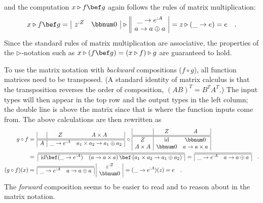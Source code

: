 and the computation $x\triangleright f\bef g$ again follows the rules
of matrix multiplication:
\[
x\triangleright f\bef g=\,\begin{array}{|cc|}
z^{:Z} & \bbnum 0\end{array}\,\triangleright\,\begin{array}{||c|}
\_\rightarrow e^{:A}\\
a\rightarrow a\oplus a
\end{array}\,=z\triangleright(\_\rightarrow e)=e\quad.
\]
Since the standard rules of matrix multiplication are associative,
the properties of the $\triangleright$-notation such as $x\triangleright(f\bef g)=(x\triangleright f)\triangleright g$
are guaranteed to hold.

To use the matrix notation with \emph{backward} compositions ($f\circ g$),
all function matrices need to be transposed. (A standard identity
of matrix calculus is that the transposition reverses the order of
composition, $\left(AB\right)^{T}=B^{T}A^{T}$.) The input types will
then appear in the top row and the output types in the left column;
the double line is above the matrix since that is where the function
inputs come from. The above calculations are then rewritten as
\begin{align*}
g\circ f & =\,\begin{array}{|c|cc|}
 & Z & A\times A\\
\hline\hline A & \_\rightarrow e^{:A} & a_{1}\times a_{2}\rightarrow a_{1}\oplus a_{2}
\end{array}\,\circ\,\begin{array}{|c|cc|}
 & Z & A\\
\hline\hline Z & \text{id} & \bbnum 0\\
A\times A & \bbnum 0 & a\rightarrow a\times a
\end{array}\\
 & =\,\,\begin{array}{|cc|}
\hline\hline \text{id}\bef(\_\rightarrow e^{:A}) & \left(a\rightarrow a\times a\right)\bef\left(a_{1}\times a_{2}\rightarrow a_{1}\oplus a_{2}\right)\end{array}\,=\,\begin{array}{|cc|}
\hline\hline \_\rightarrow e^{:A} & a\rightarrow a\oplus a\end{array}\quad.\\
(g\circ f)(x) & =\,\begin{array}{|cc|}
\hline\hline \_\rightarrow e^{:A} & a\rightarrow a\oplus a\end{array}\,\,\begin{array}{|c|}
z^{:Z}\\
\bbnum 0
\end{array}\,=(\_\rightarrow e^{:A})(z)=e\quad.
\end{align*}
The \emph{forward} composition seems to be easier to read and to reason
about in the matrix notation.

